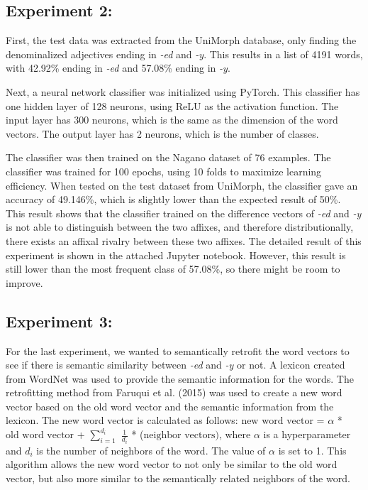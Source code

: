 \documentclass[12pt]{article}
\begin{document}
    \subsection{Experiment 2:}
    First, the test data was extracted from the UniMorph database, only finding the denominalized adjectives ending in \emph{-ed} and \emph{-y}. This results in a list of 4191 words, with 42.92\% ending in \emph{-ed} and 57.08\% ending in \emph{-y}. 

    Next, a neural network classifier was initialized using PyTorch. This classifier has one hidden layer of 128 neurons, using ReLU as the activation function. The input layer has 300 neurons, which is the same as the dimension of the word vectors. The output layer has 2 neurons, which is the number of classes.  
    
    The classifier was then trained on the Nagano dataset of 76 examples. The classifier was trained for 100 epochs, using 10 folds to maximize learning efficiency. When tested on the test dataset from UniMorph, the classifier gave an accuracy of 49.146\%, which is slightly lower than the expected result of 50\%. This result shows that the classifier trained on the difference vectors of \emph{-ed} and \emph{-y} is not able to distinguish between the two affixes, and therefore distributionally, there exists an affixal rivalry between these two affixes. The detailed result of this experiment is shown in the attached Jupyter notebook. However, this result is still lower than the most frequent class of 57.08\%, so there might be room to improve. 

    \subsection{Experiment 3:}
    For the last experiment, we wanted to semantically retrofit the word vectors to see if there is semantic similarity between \emph{-ed} and \emph{-y} or not. A lexicon created from WordNet was used to provide the semantic information for the words. The retrofitting method from Faruqui et al. (2015) was used to create a new word vector based on the old word vector and the semantic information from the lexicon. The new word vector is calculated as follows: $\text{new word vector}$ = $\alpha$ * $\text{old word vector}$ + $\sum_{i=1}^{d_i}$ $\frac{1}{d_i}$ * ($\text{neighbor vectors})$, where $\alpha$ is a hyperparameter and $d_i$ is the number of neighbors of the word. The value of $\alpha$ is set to 1. This algorithm allows the new word vector to not only be similar to the old word vector, but also more similar to the semantically related neighbors of the word.
\end{document}
